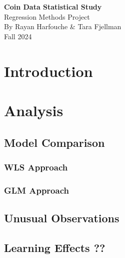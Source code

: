 \documentclass[a4paper, 12pt,oneside]{article}
\begin{document}
 
	\begin{center}
	    \Large
	    \textbf{Coin Data Statistical Study}\\
	    \large
		Regression Methods Project \\
	    By Rayan Harfouche \& Tara Fjellman \\
	    \small{Fall 2024}
	\end{center}
	\section{Introduction}
	\lipsum[1]
	\section{Analysis}
		\subsection{Model Comparison}
			\subsubsection{WLS Approach}

			\subsubsection{GLM Approach}

		\subsection{Unusual Observations}

		\subsection{Learning Effects ??}
\end{document}
